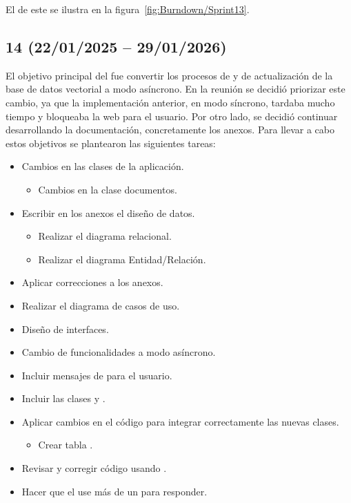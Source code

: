 El  de este  se ilustra en la figura~\ref{fig:Burndown/Sprint13}.

\subsection{ 14 (22/01/2025 -- 29/01/2026)}

El objetivo principal del  fue convertir los procesos de  y de actualización de la base de datos vectorial a modo asíncrono. En la reunión se decidió priorizar este cambio, ya que la implementación anterior, en modo síncrono, tardaba mucho tiempo y bloqueaba la web para el usuario. Por otro lado, se decidió continuar desarrollando la documentación, concretamente los anexos. Para llevar a cabo estos objetivos se plantearon las siguientes tareas:
\begin{itemize}
\tightlist
	\item Cambios en las clases de la aplicación.
	\begin{itemize}
	\tightlist
		\item Cambios en la clase documentos.
	\end{itemize} 
	\item Escribir en los anexos el diseño de datos.
	\begin{itemize}
	\tightlist
		\item Realizar el diagrama relacional.
		\item Realizar el diagrama Entidad/Relación.
	\end{itemize}
	\item Aplicar correcciones a los anexos.
	\item Realizar el diagrama de casos de uso.
	\item Diseño de interfaces.
	\item Cambio de funcionalidades a modo asíncrono.
	\item Incluir mensajes de  para el usuario.
	\item Incluir las clases  y .
	\item Aplicar cambios en el código para integrar correctamente las nuevas clases.
	\begin{itemize}
	\tightlist
		\item Crear tabla .
	\end{itemize}
	\item Revisar y corregir código usando .
	\item Hacer que el  use más de un  para responder.
\end{itemize}

